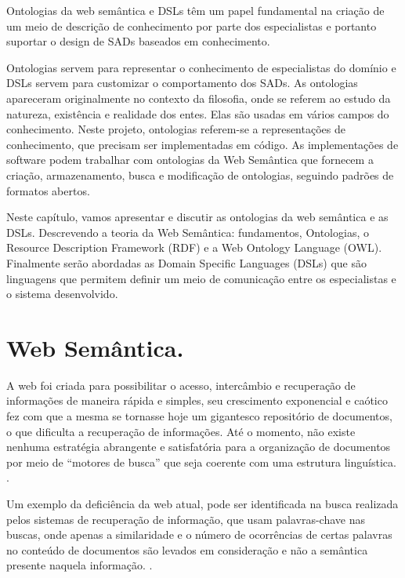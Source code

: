 Ontologias da web semântica e \foreignlanguage{english}{DSLs} têm
um papel fundamental na criação de um meio de descrição de conhecimento
por parte dos especialistas e portanto suportar o design de SADs baseados
em conhecimento. 

Ontologias servem para representar o conhecimento de especialistas
do domínio e DSLs servem para customizar o comportamento dos SADs.
As ontologias apareceram originalmente no contexto da filosofia, onde
se referem ao estudo da natureza, existência e realidade dos entes.
Elas são usadas em vários campos do conhecimento. Neste projeto, ontologias
referem-se a representações de conhecimento, que precisam ser implementadas
em código. As implementações de software podem trabalhar com ontologias
da Web Semântica que fornecem a criação, armazenamento, busca e modificação
de ontologias, seguindo padrões de formatos abertos. 

Neste capítulo, vamos apresentar e discutir as ontologias da web semântica
e as DSLs. Descrevendo a teoria da Web Semântica: fundamentos, Ontologias,
o \foreignlanguage{english}{Resource Description Framework (RDF})
e a \foreignlanguage{english}{Web Ontology Language} (\foreignlanguage{english}{OWL}).
Finalmente serão abordadas as \foreignlanguage{english}{Domain Specific
Languages (DSLs}) que são linguagens que permitem definir um meio
de comunicação entre os especialistas e o sistema desenvolvido.

\section{Web Semântica.}

A web foi criada para possibilitar o acesso, intercâmbio e recuperação
de informações de maneira rápida e simples, seu crescimento exponencial
e caótico fez com que a mesma se tornasse hoje um gigantesco repositório
de documentos, o que dificulta a recuperação de informações. Até o
momento, não existe nenhuma estratégia abrangente e satisfatória para
a organização de documentos por meio de “motores de busca” que seja
coerente com uma estrutura linguística. \citep{Souza:2004}.

Um exemplo da deficiência da web atual, pode ser identificada na busca
realizada pelos sistemas de recuperação de informação, que usam palavras-chave
nas buscas, onde apenas a similaridade e o número de ocorrências de
certas palavras no conteúdo de documentos são levados em consideração
e não a semântica presente naquela informação. \citep{Souza:2004}.

